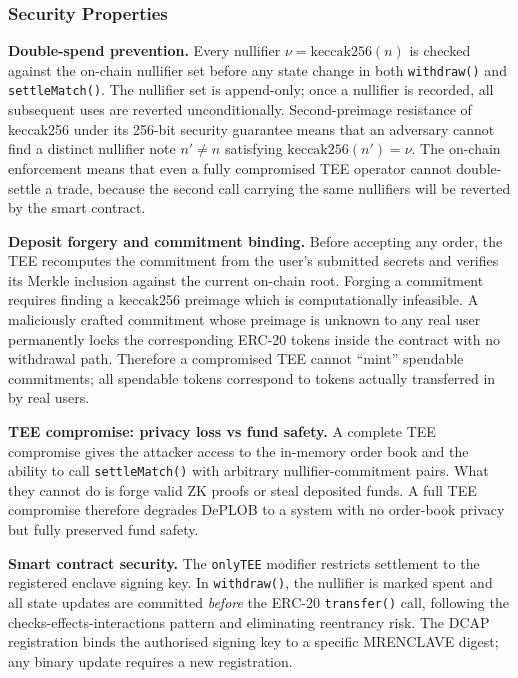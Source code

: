 \documentclass[12pt,a4paper]{article}
\begin{document}
\subsubsection{Security Properties}

\textbf{Double-spend prevention.} Every nullifier $\nu = \text{keccak256}(n)$ is checked against the on-chain nullifier set before any state change in both \texttt{withdraw()} and \texttt{settleMatch()}. The nullifier set is append-only; once a nullifier is recorded, all subsequent uses are reverted unconditionally. Second-preimage resistance of keccak256 under its 256-bit security guarantee means that an adversary cannot find a distinct nullifier note $n' \neq n$ satisfying $\text{keccak256}(n') = \nu$. The on-chain enforcement means that even a fully compromised TEE operator cannot double-settle a trade, because the second call carrying the same nullifiers will be reverted by the smart contract.

\textbf{Deposit forgery and commitment binding.} Before accepting any order, the TEE recomputes the commitment from the user's submitted secrets and verifies its Merkle inclusion against the current on-chain root. Forging a commitment requires finding a keccak256 preimage which is computationally infeasible. A maliciously crafted commitment whose preimage is unknown to any real user permanently locks the corresponding ERC-20 tokens inside the contract with no withdrawal path. Therefore a compromised TEE cannot ``mint'' spendable commitments; all spendable tokens correspond to tokens actually transferred in by real users.

\textbf{TEE compromise: privacy loss vs fund safety.} A complete TEE compromise gives the attacker access to the in-memory order book and the ability to call \texttt{settleMatch()} with arbitrary nullifier-commitment pairs. What they cannot do is forge valid ZK proofs or steal deposited funds. A full TEE compromise therefore degrades DePLOB to a system with no order-book privacy but fully preserved fund safety.

\textbf{Smart contract security.} The \texttt{onlyTEE} modifier restricts settlement to the registered enclave signing key. In \texttt{withdraw()}, the nullifier is marked spent and all state updates are committed \textit{before} the ERC-20 \texttt{transfer()} call, following the checks-effects-interactions pattern and eliminating reentrancy risk. The DCAP registration binds the authorised signing key to a specific MRENCLAVE digest; any binary update requires a new registration.
\end{document}
